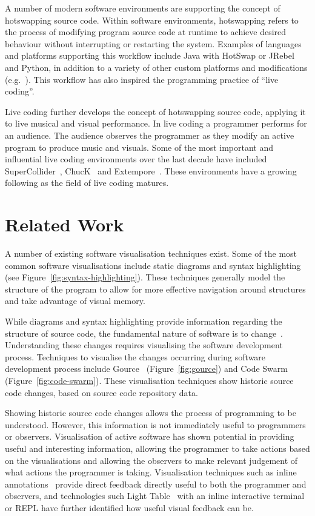 A number of modern software environments are supporting the concept of hotswapping source code. Within software environments, hotswapping refers to the process of modifying program source code at runtime to achieve desired behaviour without interrupting or restarting the system. Examples of languages and platforms supporting this workflow include Java with HotSwap or JRebel~\cite{ZeroTurnaround2014} and Python, in addition to a variety of other custom platforms and modifications (e.g.~\cite{Thomas2011}). This workflow has also inspired the programming practice of ``live coding''. 

Live coding further develops the concept of hotswapping source code, applying it to live musical and visual performance. In live coding a programmer performs for an audience. The audience observes the programmer as they modify an active program to produce music and visuals. Some of the most important and influential live coding environments over the last decade have included SuperCollider~\cite{McCartney}, ChucK~\cite{Wang2008} and Extempore~\cite{Sorensen}. These environments have a growing following as the field of live coding matures.

\section{Related Work}

A number of existing software visualisation techniques exist. Some of the most common software visualisations include static diagrams and syntax highlighting (see Figure~\ref{fig:syntax-highlighting}). These techniques generally model the structure of the program to allow for more effective navigation around structures and take advantage of visual memory.

While diagrams and syntax highlighting provide information regarding the structure of source code, the fundamental nature of software is to change~\cite{Brooks1995}. Understanding these changes requires visualising the software development process. Techniques to visualise the changes occurring during software development process include Gource~\cite{Caudwell2010} (Figure~\ref{fig:gource}) and Code Swarm~\cite{Ogawa2012} (Figure~\ref{fig:code-swarm}). These visualisation techniques show historic source code changes, based on source code repository data.



Showing historic source code changes allows the process of programming to be understood. However, this information is not immediately useful to programmers or observers. Visualisation of active software has shown potential in providing useful and interesting information, allowing the programmer to take actions based on the visualisations and allowing the observers to make relevant judgement of what actions the programmer is taking. Visualisation techniques such as inline annotations~\cite{Swift2013,Beck2013} provide direct feedback directly useful to both the programmer and observers, and technologies such Light Table~\cite{Kodowa2014} with an inline interactive terminal or \ac{REPL} have further identified how useful visual feedback can be.

